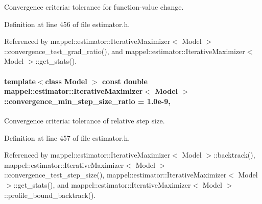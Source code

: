 Convergence criteria\+: tolerance for function-\/value change. 



Definition at line 456 of file estimator.\+h.



Referenced by mappel\+::estimator\+::\+Iterative\+Maximizer$<$ Model $>$\+::convergence\+\_\+test\+\_\+grad\+\_\+ratio(), and mappel\+::estimator\+::\+Iterative\+Maximizer$<$ Model $>$\+::get\+\_\+stats().

\paragraph[{\texorpdfstring{convergence\+\_\+min\+\_\+step\+\_\+size\+\_\+ratio}{convergence_min_step_size_ratio}}]{\setlength{\rightskip}{0pt plus 5cm}template$<$class Model $>$ const double {\bf mappel\+::estimator\+::\+Iterative\+Maximizer}$<$ Model $>$\+::convergence\+\_\+min\+\_\+step\+\_\+size\+\_\+ratio = 1.\+0e-\/9\hspace{0.3cm}{\ttfamily [static]}, {\ttfamily [protected]}}\hypertarget{classmappel_1_1estimator_1_1IterativeMaximizer_a4daa3375ddf2e676980a33630c186f92}{}\label{classmappel_1_1estimator_1_1IterativeMaximizer_a4daa3375ddf2e676980a33630c186f92}


Convergence criteria\+: tolerance of relative step size. 



Definition at line 457 of file estimator.\+h.



Referenced by mappel\+::estimator\+::\+Iterative\+Maximizer$<$ Model $>$\+::backtrack(), mappel\+::estimator\+::\+Iterative\+Maximizer$<$ Model $>$\+::convergence\+\_\+test\+\_\+step\+\_\+size(), mappel\+::estimator\+::\+Iterative\+Maximizer$<$ Model $>$\+::get\+\_\+stats(), and mappel\+::estimator\+::\+Iterative\+Maximizer$<$ Model $>$\+::profile\+\_\+bound\+\_\+backtrack().

